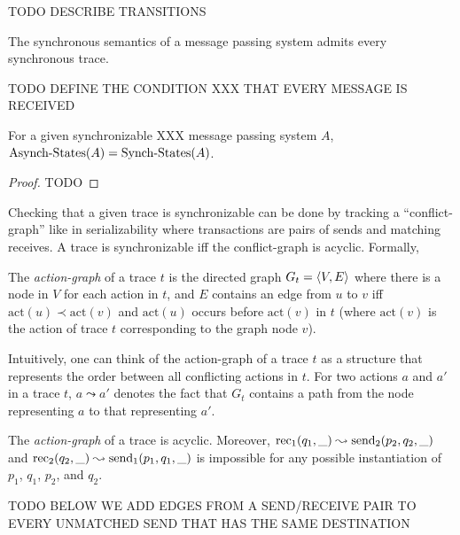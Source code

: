 TODO DESCRIBE TRANSITIONS 

\begin{lemma}\label{lem:sync_traces}
The synchronous semantics of a message passing system admits every synchronous trace.
\end{lemma}

TODO DEFINE THE CONDITION XXX THAT EVERY MESSAGE IS RECEIVED

\begin{lemma}
For a given synchronizable XXX message passing system $A$, $\mathrm{Asynch}\text{-}\mathrm{States}(A)=\mathrm{Synch}\text{-}\mathrm{States}(A)$.
\end{lemma}
\begin{proof}
TODO 
\end{proof}

Checking that a given trace is synchronizable can be done by tracking a ``conflict-graph'' like in serializability 
where transactions are pairs of sends and matching receives. 
A trace is synchronizable if{f} the conflict-graph is acyclic. Formally,

\begin{definition}\label{def:pr_graphs}
    The \emph{action-graph} of a trace $t$ is the directed graph 
    $G_t = \left\langle {V,E} \right\rangle$ where there is a node in $V$ for each action in $t$, and $E$ 
    contains an edge from $u$ to $v$ iff $\mathrm{act}(u) \prec \mathrm{act}(v)$ and $\mathrm{act}(u)$ occurs before $\mathrm{act}(v)$ in $t$ (where $\mathrm{act}(v)$ is the action of trace $t$ corresponding to the graph node $v$).
\end{definition}
Intuitively, one can think of the action-graph of a trace $t$ as a structure that represents the order between all conflicting actions in $t$.
For two actions $a$ and $a'$ in a trace $t$, $a\leadsto a'$ denotes the fact that $G_t$ contains a path from the node representing $a$ to that representing $a'$.

\begin{lemma}\label{lem:acyclic_ag}
	The \emph{action-graph} of a trace is acyclic. Moreover, $\mathrm{rec}_{1}({q_1,\_})\leadsto \mathrm{send}_{2}({p_2,q_2,\_})$ and $\mathrm{rec}_{2}({q_2,\_})\leadsto \mathrm{send}_{1}({p_1,q_1,\_})$ is impossible for any possible instantiation of $p_1$, $q_1$, $p_2$, and $q_2$.
\end{lemma}

TODO BELOW WE ADD EDGES FROM A SEND/RECEIVE PAIR TO EVERY UNMATCHED SEND THAT HAS THE SAME DESTINATION

